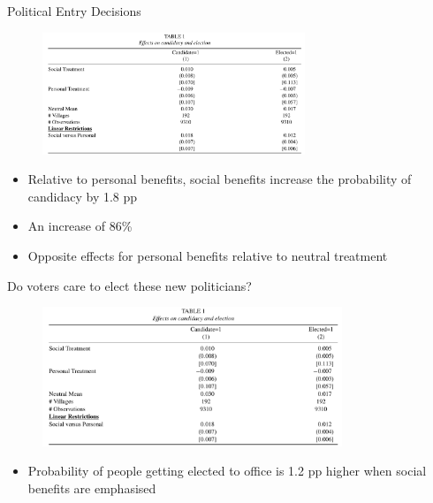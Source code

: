 \documentclass[11pt,notes=hide,aspectratio=169,mathserif]{beamer}
\begin{document}
\begin{frame}{Political Entry Decisions}
    \begin{figure}
        \centering
        \includegraphics[width=0.7\textwidth]{inputs/table1.png}
        \end{figure}
\begin{itemize}
\item Relative to personal benefits, social benefits increase the probability of candidacy by 1.8 pp
\item An increase of 86\% 
\item Opposite effects for personal benefits relative to neutral treatment
\end{itemize}
\end{frame}

\begin{frame}{Do voters care to elect these new politicians?}
    \begin{figure}
        \centering
        \includegraphics[width=0.8\textwidth]{inputs/table1.png}
        \end{figure}
        \begin{itemize}
    \item Probability of people getting elected to office is 1.2 pp higher when social benefits are emphasised
\end{itemize}
\end{frame}
\end{document}
